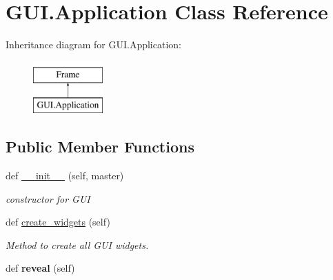 \hypertarget{class_g_u_i_1_1_application}{}\section{G\+U\+I.\+Application Class Reference}
\label{class_g_u_i_1_1_application}
Inheritance diagram for G\+U\+I.\+Application\+:\begin{figure}[H]
\begin{center}
\leavevmode
\includegraphics[height=2.000000cm]{class_g_u_i_1_1_application}
\end{center}
\end{figure}
\subsection*{Public Member Functions}
\begin{DoxyCompactItemize}
\item 
\hypertarget{class_g_u_i_1_1_application_a66fd072a15ec95d3c778c10c1484961a}{}\label{class_g_u_i_1_1_application_a66fd072a15ec95d3c778c10c1484961a} 
def \hyperlink{class_g_u_i_1_1_application_a66fd072a15ec95d3c778c10c1484961a}{\+\_\+\+\_\+init\+\_\+\+\_\+} (self, master)
\begin{DoxyCompactList}\small\item\em constructor for G\+UI \end{DoxyCompactList}\item 
def \hyperlink{class_g_u_i_1_1_application_a84a6c38f860f505a4bb7a0356393d24a}{create\+\_\+widgets} (self)
\begin{DoxyCompactList}\small\item\em Method to create all G\+UI widgets. \end{DoxyCompactList}\item 
\hypertarget{class_g_u_i_1_1_application_a25e3c2fd5e8bd6714c49930806f8a362}{}\label{class_g_u_i_1_1_application_a25e3c2fd5e8bd6714c49930806f8a362} 
def {\bfseries reveal} (self)
\end{DoxyCompactItemize}
